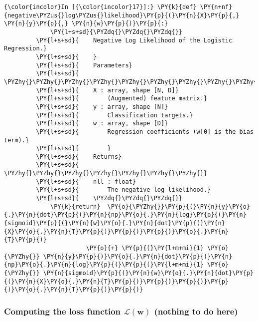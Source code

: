     \begin{Verbatim}[commandchars=\\\{\}]
{\color{incolor}In [{\color{incolor}17}]:} \PY{k}{def} \PY{n+nf}{negative\PYZus{}log\PYZus{}likelihood}\PY{p}{(}\PY{n}{X}\PY{p}{,} \PY{n}{y}\PY{p}{,} \PY{n}{w}\PY{p}{)}\PY{p}{:}
             \PY{l+s+sd}{\PYZdq{}\PYZdq{}\PYZdq{}}
         \PY{l+s+sd}{    Negative Log Likelihood of the Logistic Regression.}
         \PY{l+s+sd}{    }
         \PY{l+s+sd}{    Parameters}
         \PY{l+s+sd}{    \PYZhy{}\PYZhy{}\PYZhy{}\PYZhy{}\PYZhy{}\PYZhy{}\PYZhy{}\PYZhy{}\PYZhy{}\PYZhy{}}
         \PY{l+s+sd}{    X : array, shape [N, D]}
         \PY{l+s+sd}{        (Augmented) feature matrix.}
         \PY{l+s+sd}{    y : array, shape [N]}
         \PY{l+s+sd}{        Classification targets.}
         \PY{l+s+sd}{    w : array, shape [D]}
         \PY{l+s+sd}{        Regression coefficients (w[0] is the bias term).}
         \PY{l+s+sd}{        }
         \PY{l+s+sd}{    Returns}
         \PY{l+s+sd}{    \PYZhy{}\PYZhy{}\PYZhy{}\PYZhy{}\PYZhy{}\PYZhy{}\PYZhy{}}
         \PY{l+s+sd}{    nll : float}
         \PY{l+s+sd}{        The negative log likelihood.}
         \PY{l+s+sd}{    \PYZdq{}\PYZdq{}\PYZdq{}}
             \PY{k}{return}  \PY{o}{\PYZhy{}}\PY{p}{(}\PY{n}{y}\PY{o}{.}\PY{n}{dot}\PY{p}{(}\PY{n}{np}\PY{o}{.}\PY{n}{log}\PY{p}{(}\PY{n}{sigmoid}\PY{p}{(}\PY{n}{w}\PY{o}{.}\PY{n}{dot}\PY{p}{(}\PY{n}{X}\PY{o}{.}\PY{n}{T}\PY{p}{)}\PY{p}{)}\PY{p}{)}\PY{o}{.}\PY{n}{T}\PY{p}{)} 
                       \PY{o}{+} \PY{p}{(}\PY{l+m+mi}{1} \PY{o}{\PYZhy{}} \PY{n}{y}\PY{p}{)}\PY{o}{.}\PY{n}{dot}\PY{p}{(}\PY{n}{np}\PY{o}{.}\PY{n}{log}\PY{p}{(}\PY{p}{(}\PY{l+m+mi}{1} \PY{o}{\PYZhy{}} \PY{n}{sigmoid}\PY{p}{(}\PY{n}{w}\PY{o}{.}\PY{n}{dot}\PY{p}{(}\PY{n}{X}\PY{o}{.}\PY{n}{T}\PY{p}{)}\PY{p}{)}\PY{p}{)}\PY{p}{)}\PY{o}{.}\PY{n}{T}\PY{p}{)}\PY{p}{)}
\end{Verbatim}

    \hypertarget{computing-the-loss-function-mathcallmathbfw-nothing-to-do-here}{%
\subsubsection{\texorpdfstring{Computing the loss function
\(\mathcal{L}(\mathbf{w})\) (nothing to do
here)}{Computing the loss function \textbackslash{}mathcal\{L\}(\textbackslash{}mathbf\{w\}) (nothing to do here)}}\label{computing-the-loss-function-mathcallmathbfw-nothing-to-do-here}}

